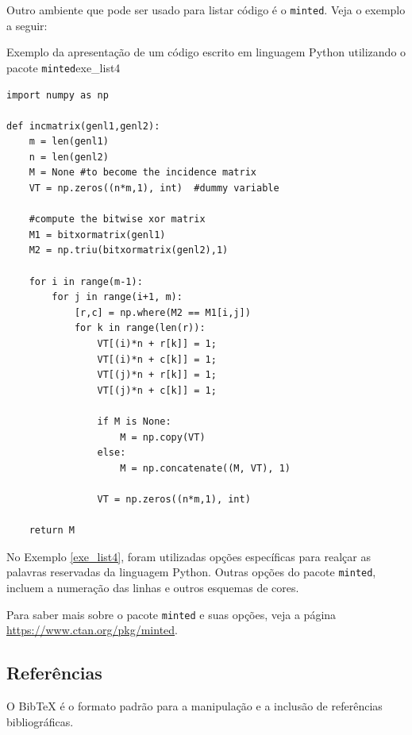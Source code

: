 Outro ambiente que pode ser usado para listar código é o {\tt minted}. Veja o exemplo a seguir:

\begin{texexptitled}[breakable,center lower,enhanced,middle=2mm,boxsep=5mm]{Exemplo da apresentação de um código escrito em linguagem Python utilizando o pacote {\tt minted}}{exe_list4}
\begin{verbatim}
import numpy as np
 
def incmatrix(genl1,genl2):
    m = len(genl1)
    n = len(genl2)
    M = None #to become the incidence matrix
    VT = np.zeros((n*m,1), int)  #dummy variable
 
    #compute the bitwise xor matrix
    M1 = bitxormatrix(genl1)
    M2 = np.triu(bitxormatrix(genl2),1) 
 
    for i in range(m-1):
        for j in range(i+1, m):
            [r,c] = np.where(M2 == M1[i,j])
            for k in range(len(r)):
                VT[(i)*n + r[k]] = 1;
                VT[(i)*n + c[k]] = 1;
                VT[(j)*n + r[k]] = 1;
                VT[(j)*n + c[k]] = 1;
 
                if M is None:
                    M = np.copy(VT)
                else:
                    M = np.concatenate((M, VT), 1)
 
                VT = np.zeros((n*m,1), int)
 
    return M
\end{verbatim}
\end{texexptitled}

No Exemplo \ref{exe_list4}, foram utilizadas opções específicas para realçar as palavras reservadas da linguagem Python. Outras opções do pacote {\tt minted}, incluem a numeração das linhas e outros esquemas de cores.

\begin{marker}
  Para saber mais sobre o pacote {\tt minted} e suas opções, veja a página \url{https://www.ctan.org/pkg/minted}.
\end{marker}

\subsection*{Referências}
\label{sec:refs}

O BibTeX é o formato padrão para a manipulação e a inclusão de referências bibliográficas.

